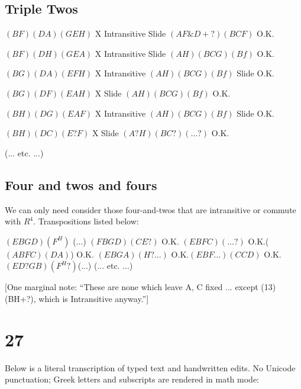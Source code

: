 \documentclass[12pt]{article}
\begin{document}
\subsection*{Triple Twos}

\noindent
\((BF)(DA)(GEH)\)  
\quad X  
\quad Intransitive  
\quad Slide \((A F \& D+?)(B C F)\) O.K.

\bigskip

\((BF)(DH)(GEA)\)  
\quad X  
\quad Intransitive  
\quad Slide \((AH)(BCG)(Bf)\) O.K.

\bigskip

\((BG)(DA)(EFH)\)  
\quad X  
\quad Intransitive  
\quad \((AH)(BCG)(Bf)\) Slide O.K.

\bigskip

\((BG)(DF)(EAH)\)  
\quad X  
\quad Slide \((AH)(BCG)(Bf)\) O.K.

\bigskip

\((BH)(DG)(EAF)\)  
\quad X  
\quad Intransitive  
\quad \((AH)(BCG)(Bf)\) Slide O.K.

\bigskip

\((BH)(DC)(E?F)\)  
\quad X  
\quad Slide \((A?H)(BC?)(\ldots ?)\) O.K.

(... etc. ...)

\bigskip

\subsection*{Four and twos and fours}

\noindent
We can only need consider those four-and-twos that are intransitive
or commute with \(R^4\).  Transpositions listed below:

\((EBGD)(F^H)\) \quad (...)  
\((FBGD)(CE?)\) \quad O.K.  
\((EBFC)(\ldots ?)\) \quad O.K.\quad (\((ABFC)(DA)\))  O.K.  
\((EBGA)(H? \ldots )\) \quad O.K.\quad \((EBF\ldots )(CCD)\) O.K.  
\((ED?G B)(F^H?)\)(...)  
(... etc. ...)

[One marginal note: ``These are none which leave A, C fixed ... except (13)(BH+?), which is Intransitive anyway.'']

\section{27}

Below is a literal transcription of typed text and handwritten edits. 
No Unicode punctuation; Greek letters and subscripts are rendered in math mode:

\bigskip
\end{document}
